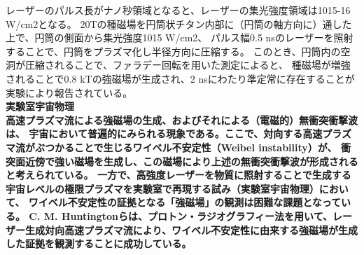 \documentclass[a4paper,11pt,titlepage]{jsarticle}
\begin{document}
  \rm
  レーザーのパルス長がナノ秒領域となると、レーザーの集光強度領域は1015-16 W/cm2となる。
  20Tの種磁場を円筒状チタン内部に（円筒の軸方向に）通した上で、円筒の側面から集光強度1015 W/cm2、
  パルス幅0.5 nsのレーザーを照射することで、円筒をプラズマ化し半径方向に圧縮する。
  このとき、円筒内の空洞が圧縮されることで、ファラデー回転を用いた測定によると、
  種磁場が増強されることで0.8 kTの強磁場が生成され、2 nsにわたり準定常に存在することが実験により報告されている。\cite{kansei}\\
  \bf{実験室宇宙物理}\\
  \rm
  高速プラズマ流による強磁場の生成、およびそれによる（電磁的）無衝突衝撃波は、
  宇宙において普遍的にみられる現象である。ここで、対向する高速プラズマ流がぶつかることで生じるワイベル不安定性（Weibel instability）が、
  衝突面近傍で強い磁場を生成し、この磁場により上述の無衝突衝撃波が形成されると考えられている。
  一方で、高強度レーザーを物質に照射することで生成する宇宙レベルの極限プラズマを実験室で再現する試み（実験室宇宙物理）において、
  ワイベル不安定性の証拠となる「強磁場」の観測は困難な課題となっている。
  C. M. Huntingtonらは、プロトン・ラジオグラフィー法を用いて、レーザー生成対向高速プラズマ流により、ワイベル不安定性に由来する強磁場が生成した証拠を観測することに成功している。\cite{zikken}
 
\end{document}
